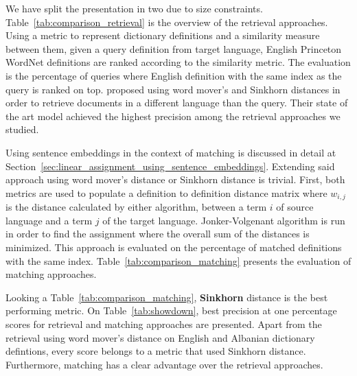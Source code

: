 We have split the presentation in two due to size constraints.
Table~\ref{tab:comparison_retrieval} is the overview of the retrieval approaches.
Using a metric to represent dictionary definitions and a similarity measure between them, given a query definition from target language, English Princeton WordNet definitions are ranked according to the similarity metric.
The evaluation is the percentage of queries where English definition with the same index as the query is ranked on top.
\textcite{balikasCrosslingual2018} proposed using word mover's and Sinkhorn distances in order to retrieve documents in a different language than the query.
Their state of the art model achieved the highest precision among the retrieval approaches we studied.

Using sentence embeddings in the context of matching is discussed in detail at Section~\ref{sec:linear_assignment_using_sentence_embeddings}.
Extending said approach using word mover's distance or Sinkhorn distance is trivial.
First, both metrics are used to populate a definition to definition distance matrix where $w_{i,j}$ is the distance calculated by either algorithm, between a term $i$ of source language and a term $j$ of the target language.
Jonker-Volgenant algorithm is run in order to find the assignment where the overall sum of the distances is minimized.
This approach is evaluated on the percentage of matched definitions with the same index.
Table~\ref{tab:comparison_matching} presents the evaluation of matching approaches.

Looking a Table~\ref{tab:comparison_matching}, \textbf{Sinkhorn} distance is the best performing metric.
On Table~\ref{tab:showdown}, best precision at one percentage scores for retrieval and matching approaches are presented.
Apart from the retrieval using word mover's distance on English and Albanian dictionary defintions, every score belongs to a metric that used Sinkhorn distance.
Furthermore, matching has a clear advantage over the retrieval approaches.

